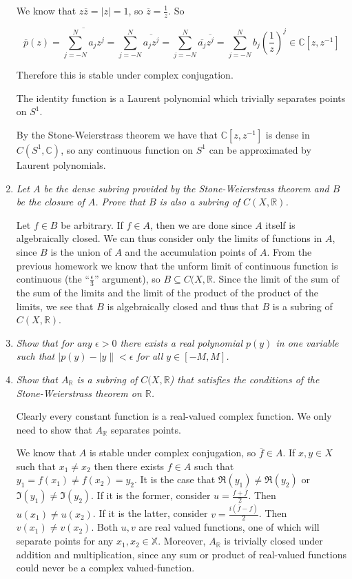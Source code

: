 \documentclass[11pt]{article}
\begin{document}
\begin{enumerate}
We know that $z\overline{z} = |z| = 1$, so $\overline{z} = \frac{1}{z}$.  So

\[ \overline{p}(z) = \overline{\sum_{j=-N}^N a_j z^j} = \sum_{j=-N}^N \overline{a_j z^j} = \sum_{j=-N}^N \overline{a_j} \overline{z^j} =  \sum_{j=-N}^N b_j \left(\frac{1}{z}\right)^j \in \mathbb{C}[z,z^{-1}]\] 

Therefore this is stable under complex conjugation.

The identity function is a Laurent polynomial which trivially separates points on $S^1$.

By the Stone-Weierstrass theorem we have that $\mathbb{C}[z,z^{-1}]$ is dense in $C(S^1,\mathbb{C})$, so any continuous function on $S^1$ can be approximated by Laurent polynomials.

\item \emph{Let $A$ be the dense subring provided by the Stone-Weierstrass theorem and $B$ be the closure of $A$.  Prove that $B$ is also a subring of $C(X,\mathbb{R})$.}

Let $f \in B$ be arbitrary.  If $f \in A$, then we are done since $A$ itself is algebraically closed.  We can thus consider only the limits of functions in $A$, since $B$ is the union of $A$ and the accumulation points of $A$.  From the previous homework we know that the unform limit of continuous function is continuous (the ``$\frac{\epsilon}{3}$'' argument), so $B \subseteq C(X,\mathbb{R}$.  Since the limit of the sum of the sum of the limits and the limit of the product of the product of the limits, we see that $B$ is algebraically closed and thus that $B$ is a subring of $C(X,\mathbb{R})$.

\item \emph{Show that for any $\epsilon > 0$ there exists a real polynomial $p(y)$ in one variable such that $|p(y)- |y\| < \epsilon$ for all $y \in [-M,M]$.}

\item \emph{Show that $A_\mathbb{R}$ is a subring of $C(X,\mathbb{R}$) that satisfies the conditions of the Stone-Weierstrass theorem on $\mathbb{R}$.}

Clearly every constant function is a real-valued complex function.  We only need to show that $A_\mathbb{R}$ separates points.

We know that $A$ is stable under complex conjugation, so $\overline{f} \in A$.  If $x,y \in X$ such that $x_1 \neq x_2$ then there exists $f \in A$ such that $y_1 = f(x_1) \neq f(x_2) = y_2$.  It is the case that $\Re(y_1) \neq \Re(y_2)$ or $\Im(y_1) \neq \Im(y_2)$.  If it is the former, consider $u = \frac{f + \overline{f}}{2}$.  Then $u(x_1) \neq u(x_2)$.  If it is the latter, consider $v = \frac{i(\overline{f} - f)}{2}$.  Then $v(x_1) \neq v(x_2)$.  Both $u,v$ are real valued functions, one of which will separate points for any $x_1,x_2 \in \mathbb{X}$.  Moreover, $A_\mathbb{R}$ is trivially closed under addition and multiplication, since any sum or product of real-valued functions could never be a complex valued-function.


\end{enumerate}
\end{document}
